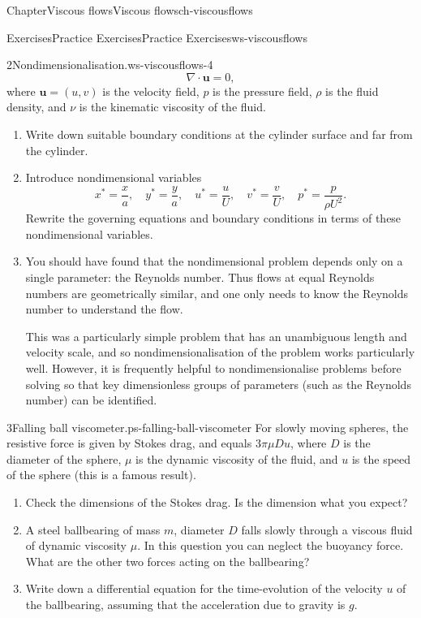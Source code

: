 \documentclass[oneside,10pt,]{book}
\numberwithin{equation}{section}
\newcommand{\bu}{\boldsymbol{u}}
\begin{document}
\begin{chapterptx}{Chapter}{Viscous flows}{}{Viscous flows}{}{}{ch-viscousflows}
\begin{exercises-section}{Exercises}{Practice Exercises}{}{Practice Exercises}{}{}{ws-viscousflows}
\begin{divisionexercise}{2}{Nondimensionalisation.}{}{ws-viscousflows-4}
\begin{equation*}
\nabla\cdot\bu=0,
\end{equation*}
where \(\bu=(u,v)\) is the velocity field, \(p\) is the pressure field, \(\rho\) is the fluid density, and \(\nu\) is the kinematic viscosity of the fluid.%
\begin{enumerate}[font=\bfseries,label=(\alph*),ref=\alph*]%
\item{}Write down suitable boundary conditions at the cylinder surface and far from the cylinder.%
\item{}Introduce nondimensional variables%
\begin{equation*}
x^*=\frac{x}{a},\quad y^*=\frac{y}{a},\quad
u^*=\frac{u}{U},\quad v^*=\frac{v}{U},\quad
p^*=\frac{p}{\rho U^2}.
\end{equation*}
Rewrite the governing equations and boundary conditions in terms of these nondimensional variables.%
\item{}You should have found that the nondimensional problem depends only on a single parameter: the Reynolds number. Thus flows at equal Reynolds numbers are geometrically similar, and one only needs to know the Reynolds number to understand the flow.%
\par
This was a particularly simple problem that has an unambiguous length and velocity scale, and so nondimensionalisation of the problem works particularly well. However, it is frequently helpful to nondimensionalise problems before solving so that key dimensionless groups of parameters (such as the Reynolds number) can be identified.%
\end{enumerate}%
\end{divisionexercise}%
\begin{divisionexercise}{3}{Falling ball viscometer.}{}{ps-falling-ball-viscometer}%
For slowly moving spheres, the resistive force is given by Stokes drag, and equals \(3\pi\mu Du\), where \(D\) is the diameter of the sphere, \(\mu\) is the dynamic viscosity of the fluid, and \(u\) is the speed of the sphere (this is a famous result).%
\begin{enumerate}[font=\bfseries,label=(\alph*),ref=\alph*]%
\item{}Check the dimensions of the Stokes drag. Is the dimension what you expect?%
\item{}A steel ballbearing of mass \(m\), diameter \(D\) falls slowly through a viscous fluid of dynamic viscosity \(\mu\). In this question you can neglect the buoyancy force. What are the other two forces acting on the ballbearing?%
\item{}Write down a differential equation for the time-evolution of the velocity \(u\) of the ballbearing, assuming that the acceleration due to gravity is \(g\).%

\end{enumerate}
\end{divisionexercise}
\end{exercises-section}
\end{chapterptx}
\end{document}
